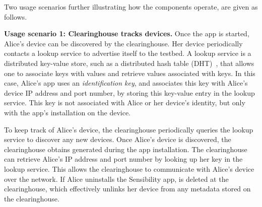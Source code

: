 Two usage scenarios further illustrating how the components operate, 
are given as follows.

\textbf{Usage scenario 1: Clearinghouse tracks devices.}
Once the app is started, Alice's device can be
discovered by the clearinghouse. Her device periodically contacts 
a lookup service to advertise itself to the testbed. 
A lookup service is a distributed key-value store, such as a 
distributed hash table (DHT)~\cite{dht}, that allows one to associate 
keys with values and retrieve values associated with keys. In this case, 
Alice's app uses an \textit{identification key},  and 
associates this key with Alice's device IP address and port number, by 
storing this key-value entry in the lookup service. This key is not 
associated with Alice or her device's identity, but only with the app's 
installation on the device. 



To keep track of Alice's device, the
clearinghouse periodically queries the lookup service to
discover any new devices. Once Alice's device is discovered, the
clearinghouse obtains  generated during the app 
installation. 
The clearinghouse can retrieve Alice's  IP address and port number by 
looking up her key in the lookup service. This allows the clearinghouse
to communicate with Alice's device over the network.
If Alice uninstalls the Sensibility app, 
 is deleted at the clearinghouse, which effectively unlinks
her device from any metadata stored on the clearinghouse.

